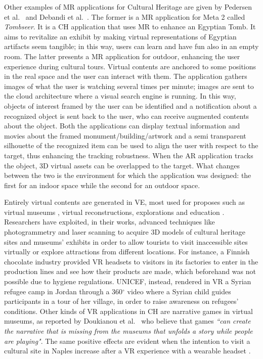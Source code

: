 Other examples of MR applications for Cultural Heritage are given by Pedersen et al.~\cite{pedersen_more_2017} and Debandi et al.~\cite{debandi_enhancing_2018}.
The former is a MR application for Meta 2 called \textit{Tombseer}. It is a CH application that uses MR to enhance an Egyptian Tomb. It aims to revitalize an exhibit by making virtual representations of Egyptian artifacts seem tangible; in this way, users can learn and have fun also in an empty room.
The latter presents a MR application for outdoor, enhancing the user experience during cultural tours. Virtual contents are anchored to some positions in the real space and the user can interact with them. The application gathers images of what the user is watching several times per minute; images are sent to the cloud architecture where a visual search engine is running. In this way, objects of interest framed by the user can be identified and a notification about a recognized object is sent back to the user, who can receive augmented contents about the object. 
Both the applications can display textual information and movies about the framed monument/building/artwork and a semi transparent silhouette of the recognized item can be used to align the user with respect to the target, thus enhancing the tracking robustness. When the AR application tracks the object, 3D virtual assets can be overlapped to the target. What changes between the two is the environment for which the application was designed: the first for an indoor space while the second for an outdoor space.

Entirely virtual contents are generated in VE, most used for proposes such as virtual museums \cite{doukianou_beyond_2020}, virtual reconstructions, explorations and education \cite{bekele_survey_2018}. Researchers have exploited, in their works, advanced techniques like photogrammetry and laser scanning to acquire 3D models of cultural heritage sites and museums' exhibits in order to allow tourists to visit inaccessible sites virtually or explore attractions from different locations. 
For instance, a Finnish chocolate industry provided VR headsets to visitors in its factories to enter in the production lines and see how their products are made, which beforehand was not possible due to hygiene regulations. UNICEF, instead, rendered in VR a Syrian refugee camp in Jordan through a 360$^{\circ}$ video where a Syrian child guides participants in a tour of her village, in order to raise awareness on refugees' conditions.
Other kinds of VR applications in CH are narrative games in virtual museums, as reported by Doukianou et al.~\cite{doukianou_beyond_2020} who believe that games \textit{“can create the narrative that is missing from the museums that unfolds a story while people are playing"}. The same positive effects are evident when the intention to visit a cultural site in Naples increase after a VR experience with a wearable headset \cite{marasco_exploring_2018}.

